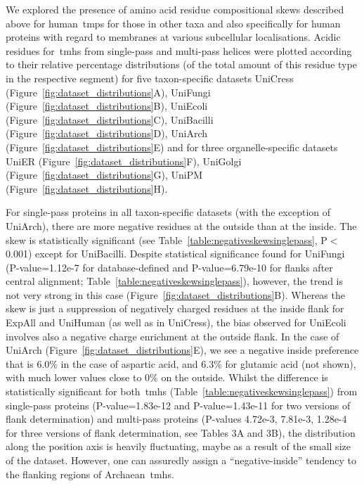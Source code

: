 We explored the presence of amino acid residue compositional skews described above for human~\gls{tmp}s for those in other taxa and also specifically for human proteins with regard to membranes at various subcellular localisations.
Acidic residues for~\gls{tmh}s from single-pass and multi-pass helices were plotted according to their relative percentage distributions (of the total amount of this residue type in the respective segment) for five taxon-specific datasets UniCress (Figure~\ref{fig:dataset_distributions}A), UniFungi (Figure~\ref{fig:dataset_distributions}B), UniEcoli (Figure~\ref{fig:dataset_distributions}C), UniBacilli (Figure~\ref{fig:dataset_distributions}D), UniArch (Figure~\ref{fig:dataset_distributions}E) and for three organelle-specific datasets UniER (Figure~\ref{fig:dataset_distributions}F), UniGolgi (Figure~\ref{fig:dataset_distributions}G), UniPM (Figure~\ref{fig:dataset_distributions}H).

For single-pass proteins in all taxon-specific datasets (with the exception of UniArch), there are more negative residues at the outside than at the inside.
The skew is statistically significant (see Table~\ref{table:negativeskewsinglepass}, P$<$0.001) except for UniBacilli.
Despite statistical significance found for UniFungi (P-value=1.12e-7 for database-defined and P-value=6.79e-10 for flanks after central alignment; Table~\ref{table:negativeskewsinglepass}), however, the trend is not very strong in this case (Figure~\ref{fig:dataset_distributions}B).
Whereas the skew is just a suppression of negatively charged residues at the inside flank for ExpAll and UniHuman (as well as in UniCress), the bias observed for UniEcoli involves also a negative charge enrichment at the outside flank.
In the case of UniArch (Figure~\ref{fig:dataset_distributions}E), we see a negative inside preference that is 6.0\% in the case of aspartic acid, and 6.3\% for glutamic acid (not shown), with much lower values close to 0\% on the outside.
Whilst the difference is statistically significant for both~\gls{tmh}s (Table~\ref{table:negativeskewsinglepass}) from single-pass proteins (P-value=1.83e-12 and P-value=1.43e-11 for two versions of flank determination) and multi-pass proteins (P-values 4.72e-3, 7.81e-3, 1.28e-4 for three versions of flank determination, see Tables 3A and 3B), the distribution along the position axis is heavily fluctuating, maybe as a result of the small size of the dataset.
However, one can assuredly assign a ``negative-inside'' tendency to the flanking regions of Archaean~\gls{tmh}s.

